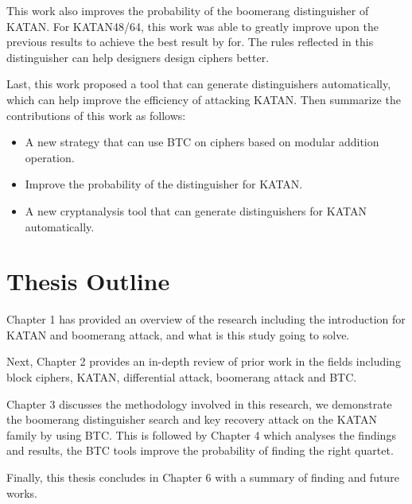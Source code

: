 This work also improves the probability of the boomerang distinguisher of KATAN. For KATAN48/64, this work was able to greatly improve upon the previous results to achieve the best result by for. The rules reflected in this distinguisher can help designers design ciphers better.

Last, this work proposed a tool that can generate distinguishers automatically, which can help improve the efficiency of attacking KATAN. Then summarize the contributions of this work as follows:

\begin{itemize}
\item A new strategy that can use BTC on ciphers based on modular addition operation.
\item Improve the probability of the distinguisher for KATAN.
\item A new cryptanalysis tool that can generate distinguishers for KATAN automatically.
\end{itemize}

\section{Thesis Outline}
Chapter 1 has provided an overview of the research including the introduction for KATAN and boomerang attack, and what is this study going to solve.

Next, Chapter 2 provides an in-depth review of prior work in the fields including block ciphers, KATAN, differential attack, boomerang attack and BTC.

Chapter 3 discusses the methodology involved in this research, we demonstrate the boomerang distinguisher search and key recovery attack on the KATAN family by using BTC. This is followed by Chapter 4 which analyses the findings and results, the BTC tools improve the probability of finding the right quartet.

Finally, this thesis concludes in Chapter 6 with a summary of finding and future works.
